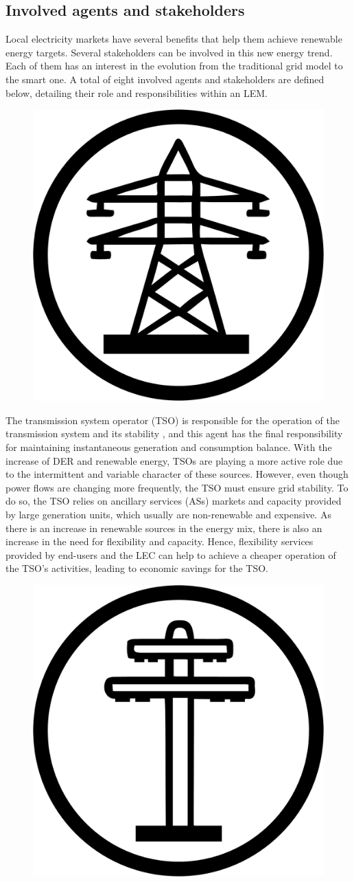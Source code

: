 \subsection{Involved agents and stakeholders} \label{sec:agents}
Local electricity markets have several benefits that help them achieve renewable energy targets. Several stakeholders can be involved in this new energy trend. Each of them has an interest in the evolution from the traditional grid model to the smart one. A total of eight involved agents and stakeholders are defined below, detailing their role and responsibilities within an LEM. \newline


\begin{figure}
\centering
	\includegraphics[width=0.1\columnwidth ]{ChapterIntro/Figures/TSO.jpg}
\end{figure} 

The transmission system operator (TSO) is responsible for the operation of the transmission system and its stability \cite{VILLAR2018Flexibility}, and this agent has the final responsibility for maintaining instantaneous generation and consumption balance. With the increase of DER and renewable energy, TSOs are playing a more active role due to the intermittent and variable character of these sources. However, even though power flows are changing more frequently, the TSO must ensure grid stability. To do so, the TSO relies on ancillary services (ASs) markets and capacity provided by large generation units, which usually are non-renewable and expensive. As there is an increase in renewable sources in the energy mix, there is also an increase in the need for flexibility and capacity. Hence, flexibility services provided by end-users and the LEC can help to achieve a cheaper operation of the TSO's activities, leading to economic savings for the TSO.

\begin{figure}
	\centering
	\includegraphics[width=0.1\columnwidth ]{ChapterIntro/Figures/DSO.jpg}
	\label{DSO}  
\end{figure}


